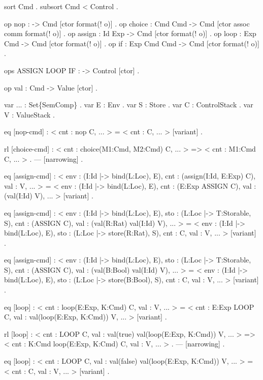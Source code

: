 \documentclass{llncs}%
\begin{document}
    sort Cmd .
    subsort Cmd < Control .

    op nop : -> Cmd [ctor format(! o)] .
    op choice : Cmd Cmd -> Cmd [ctor assoc comm format(! o)] .
    op assign : Id Exp -> Cmd [ctor format(! o)] .
    op loop : Exp Cmd -> Cmd [ctor format(! o)] .
    op if : Exp Cmd Cmd -> Cmd [ctor format(! o)] .

    ops ASSIGN LOOP IF : -> Control [ctor] . 

    op val : Cmd -> Value [ctor] .
    
    var ... : Set\{SemComp\} . var E : Env . var S : Store .
    var C : ControlStack . var V : ValueStack .

    eq [nop-cmd] :
        < cnt : nop C, ... > = < cnt : C, ... > [variant] .

    rl [choice-cmd] :
        < cnt : choice(M1:Cmd, M2:Cmd) C, ... > =>
        < cnt : M1:Cmd C, ... > . --- [narrowing] .

    eq [assign-cmd] :
        < env : (I:Id |-> bind(L:Loc), E),
          cnt : (assign(I:Id, E:Exp) C),
          val : V, ... > 
     =
        < env : (I:Id |-> bind(L:Loc), E),
          cnt : (E:Exp ASSIGN C),
          val : (val(I:Id) V), ... > [variant] .

    eq [assign-cmd] :
        < env : (I:Id |-> bind(L:Loc), E),
          sto : (L:Loc |-> T:Storable, S),
          cnt : (ASSIGN C),
          val : (val(R:Rat) val(I:Id) V), ... > 
     =
        < env : (I:Id |-> bind(L:Loc), E),
          sto : (L:Loc |-> store(R:Rat), S),
          cnt : C,
          val : V, ... > [variant] .

    eq [assign-cmd] :
        < env : (I:Id |-> bind(L:Loc), E),
          sto : (L:Loc |-> T:Storable, S),
          cnt : (ASSIGN C),
          val : (val(B:Bool) val(I:Id) V), ... > 
     =
        < env : (I:Id |-> bind(L:Loc), E),
          sto : (L:Loc |-> store(B:Bool), S),
          cnt : C,
          val : V, ... > [variant] .

    eq [loop] :
        < cnt : loop(E:Exp, K:Cmd) C, val : V, ... > 
     =
        < cnt : E:Exp LOOP C,
          val : val(loop(E:Exp, K:Cmd)) V, ... > [variant] .

    rl [loop] :
        < cnt : LOOP C,
          val : val(true) val(loop(E:Exp, K:Cmd)) V, ... > 
    =>
        < cnt : K:Cmd loop(E:Exp, K:Cmd) C,
          val : V, ... > . --- [narrowing] .

    eq [loop] :
        < cnt : LOOP C,
          val : val(false) val(loop(E:Exp, K:Cmd)) V, ... > 
     =
        < cnt : C, val : V, ... > [variant] .
\end{document}
